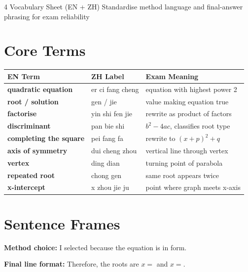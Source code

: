 \documentclass[11pt,a4paper]{article}
\newcommand{\TermEN}[1]{\textbf{#1}}
\newcommand{\TermZH}[1]{\textcolor{MMuted}{#1}}
\begin{document}

\MasteryModuleCover
  {4}
  {Vocabulary Sheet (EN + ZH)}
  {Standardise method language and final-answer phrasing for exam reliability}

\section{Core Terms}
\renewcommand{\arraystretch}{1.2}
\begin{tabularx}{\linewidth}{l l X}
\toprule
\textbf{EN Term} & \textbf{ZH Label} & \textbf{Exam Meaning} \\
\midrule
\TermEN{quadratic equation} & \TermZH{er ci fang cheng} & equation with highest power 2 \\
\TermEN{root / solution} & \TermZH{gen / jie} & value making equation true \\
\TermEN{factorise} & \TermZH{yin shi fen jie} & rewrite as product of factors \\
\TermEN{discriminant} & \TermZH{pan bie shi} & \(b^2-4ac\), classifies root type \\
\TermEN{completing the square} & \TermZH{pei fang fa} & rewrite to \((x+p)^2+q\) \\
\TermEN{axis of symmetry} & \TermZH{dui cheng zhou} & vertical line through vertex \\
\TermEN{vertex} & \TermZH{ding dian} & turning point of parabola \\
\TermEN{repeated root} & \TermZH{chong gen} & same root appears twice \\
\TermEN{x-intercept} & \TermZH{x zhou jie ju} & point where graph meets x-axis \\
\bottomrule
\end{tabularx}

\section{Sentence Frames}
\begin{keyconceptbox}
\textbf{Method choice:} I selected \underline{\hspace{2cm}} because the equation is in \underline{\hspace{2.6cm}} form.
\end{keyconceptbox}

\begin{examtipbox}
\textbf{Final line format:} Therefore, the roots are \(x=\)\underline{\hspace{1.2cm}} and \(x=\)\underline{\hspace{1.2cm}}.
\end{examtipbox}
\end{document}

